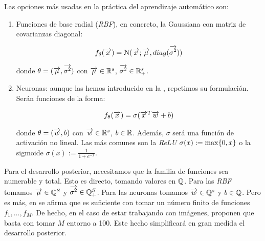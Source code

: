 Las opciones más usadas en la práctica del aprendizaje automático son:

\begin{enumerate}
    \item Funciones de base radial (\textit{RBF}), en concreto, la Gaussiana con matriz de covarianzas diagonal:

	      \begin{equation}
		      f_\theta(\overrightarrow{x}) = \mathcal{N}(\overrightarrow{x}; \overrightarrow{\mu}, diag(\overrightarrow{\sigma^2}))
	      \end{equation}

          donde $\theta = (\overrightarrow{\mu}, \overrightarrow{\sigma^2})$ con $\overrightarrow{\mu} \in \mathbb{R}^s$, $\overrightarrow{\sigma^2} \in \mathbb{R}^s_+$.

      \item Neuronas: aunque las hemos introducido en la  , repetimos su formulación. Serán funciones de la forma:

        \begin{equation}
        \begin{split}
            & f_\theta(\overrightarrow{x}) = \sigma(\overrightarrow{x}^T \overrightarrow{w} + b) \\
        \end{split}
        \end{equation}

        donde $\theta = (\overrightarrow{w}, b)$ con $\overrightarrow{w} \in \mathbb{R}^s$, $b \in \mathbb{R}$. Además, $\sigma$ será una función de activación no lineal. Las más comunes son la \textit{ReLU} $\sigma(x) := \max \{ 0, x \}$ o la sigmoide $\sigma(x) := \frac{1}{1 + e^{-x}}$.
\end{enumerate}

Para el desarrollo posterior, necesitamos que la familia de funciones sea numerable y total. Esto es directo, tomando valores en $ \mathbb{Q}$. Para las \textit{RBF} tomamos $\overrightarrow{\mu} \in \mathbb{Q}^S$ y $\overrightarrow{\sigma^2} \in \mathbb{Q}^S_+$. Para las neuronas tomamos $\overrightarrow{w} \in \mathbb{Q}^s$ y $b \in \mathbb{Q}$.  Pero es más, en \cite{matematicas:principal} se afirma que es suficiente con tomar un número finito de funciones ${f_1, \ldots, f_M}$. De hecho, en el caso de estar trabajando con imágenes, proponen que basta con tomar $M$ entorno a 100. Este hecho simplificará en gran medida el desarrollo posterior.
